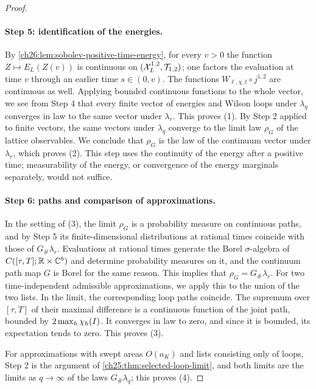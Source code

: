 \begin{proof}
\paragraph{Step 5: identification of the energies.}
By \cref{ch26:lem:sobolev-positive-time-energy}, for every $v>0$ the function $Z\mapsto E_L(Z(v))$ is continuous on $(\mathcal X_L^{1,2},\mathcal T_{1,2})$; one factors the evaluation at time $v$ through an earlier time $s\in(0,v)$. The functions $W_{\ell,\chi,t}\circ j^{1,2}$ are continuous as well. Applying bounded continuous functions to the whole vector, we see from Step 4 that every finite vector of energies and Wilson loops under $\lambda_q$ converges in law to the same vector under $\lambda_r$. This proves (1). By Step 2 applied to finite vectors, the same vectors under $\lambda_q$ converge to the limit law $\rho_G$ of the lattice observables. We conclude that $\rho_G$ is the law of the continuum vector under $\lambda_r$, which proves (2). This step uses the continuity of the energy after a positive time; measurability of the energy, or convergence of the energy marginals separately, would not suffice.

\paragraph{Step 6: paths and comparison of approximations.}
In the setting of (3), the limit $\rho_G$ is a probability measure on continuous paths, and by Step 5 its finite-dimensional distributions at rational times coincide with those of $G_\#\lambda_r$. Evaluations at rational times generate the Borel $\sigma$-algebra of $C([\tau,T];\mathbb R\times\mathbb C^b)$ and determine probability measures on it, and the continuum path map $G$ is Borel for the same reason. This implies that $\rho_G=G_\#\lambda_r$. For two time-independent admissible approximations, we apply this to the union of the two lists. In the limit, the corresponding loop paths coincide. The supremum over $[\tau,T]$ of their maximal difference is a continuous function of the joint path, bounded by $2\max_h\chi_h(I)$. It converges in law to zero, and since it is bounded, its expectation tends to zero. This proves (3).

For approximations with swept areas $O(a_K)$ and lists consisting only of loops, Step 2 is the argument of \cref{ch25:thm:selected-loop-limit}, and both limits are the limits as $q\to\infty$ of the laws $G_\#\lambda_q$; this proves (4).


\end{proof}
